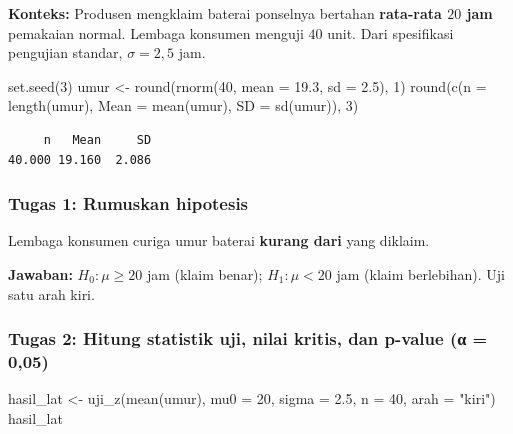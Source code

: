 \documentclass[
  indonesian,
  letterpaper,
]{book}
\newenvironment{Shaded}{\begin{snugshade}}{\end{snugshade}}
\newcommand{\AttributeTok}[1]{\textcolor[rgb]{0.40,0.45,0.13}{#1}}
\newcommand{\DecValTok}[1]{\textcolor[rgb]{0.68,0.00,0.00}{#1}}
\newcommand{\FloatTok}[1]{\textcolor[rgb]{0.68,0.00,0.00}{#1}}
\newcommand{\FunctionTok}[1]{\textcolor[rgb]{0.28,0.35,0.67}{#1}}
\newcommand{\NormalTok}[1]{\textcolor[rgb]{0.00,0.23,0.31}{#1}}
\newcommand{\OtherTok}[1]{\textcolor[rgb]{0.00,0.23,0.31}{#1}}
\newcommand{\StringTok}[1]{\textcolor[rgb]{0.13,0.47,0.30}{#1}}
\begin{document}
\textbf{Konteks:} Produsen mengklaim baterai ponselnya bertahan
\textbf{rata-rata \(20\) jam} pemakaian normal. Lembaga konsumen menguji
\(40\) unit. Dari spesifikasi pengujian standar, \(\sigma = 2{,}5\) jam.

\begin{Shaded}
\begin{Highlighting}[]
\FunctionTok{set.seed}\NormalTok{(}\DecValTok{3}\NormalTok{)}
\NormalTok{umur }\OtherTok{\textless{}{-}} \FunctionTok{round}\NormalTok{(}\FunctionTok{rnorm}\NormalTok{(}\DecValTok{40}\NormalTok{, }\AttributeTok{mean =} \FloatTok{19.3}\NormalTok{, }\AttributeTok{sd =} \FloatTok{2.5}\NormalTok{), }\DecValTok{1}\NormalTok{)}
\FunctionTok{round}\NormalTok{(}\FunctionTok{c}\NormalTok{(}\AttributeTok{n =} \FunctionTok{length}\NormalTok{(umur), }\AttributeTok{Mean =} \FunctionTok{mean}\NormalTok{(umur), }\AttributeTok{SD =} \FunctionTok{sd}\NormalTok{(umur)), }\DecValTok{3}\NormalTok{)}
\end{Highlighting}
\end{Shaded}

\begin{verbatim}
     n   Mean     SD 
40.000 19.160  2.086 
\end{verbatim}

\subsubsection{Tugas 1: Rumuskan
hipotesis}\label{tugas-1-rumuskan-hipotesis}

Lembaga konsumen curiga umur baterai \textbf{kurang dari} yang diklaim.

\textbf{Jawaban:} \(H_0: \mu \ge 20\) jam (klaim benar);
\(H_1: \mu < 20\) jam (klaim berlebihan). Uji satu arah kiri.

\subsubsection{Tugas 2: Hitung statistik uji, nilai kritis, dan p-value
(α =
0,05)}\label{tugas-2-hitung-statistik-uji-nilai-kritis-dan-p-value-ux3b1-005}

\begin{Shaded}
\begin{Highlighting}[]
\NormalTok{hasil\_lat }\OtherTok{\textless{}{-}} \FunctionTok{uji\_z}\NormalTok{(}\FunctionTok{mean}\NormalTok{(umur), }\AttributeTok{mu0 =} \DecValTok{20}\NormalTok{, }\AttributeTok{sigma =} \FloatTok{2.5}\NormalTok{, }\AttributeTok{n =} \DecValTok{40}\NormalTok{, }\AttributeTok{arah =} \StringTok{"kiri"}\NormalTok{)}
\NormalTok{hasil\_lat}
\end{Highlighting}
\end{Shaded}
\end{document}

